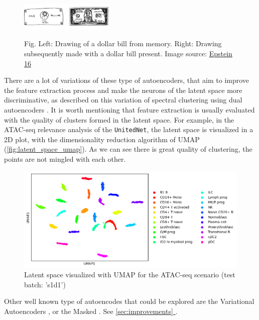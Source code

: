 \documentclass[12pt, a4paper]{article}
\newcommand*{\fullref}[1]{\hyperref[{#1}]{\ref*{#1} \nameref*{#1}}}
\begin{document}
\begin{figure}[h!]
  \centering
  \includegraphics[width=0.4\textwidth]{dollars.png}\
  \caption{Fig. Left: Drawing of a dollar bill from memory. Right: Drawing subsequently made with a dollar bill present. Image source: \href{https://ankeshanand.com/blog/2020/01/26/contrative-self-supervised-learning.html}{Epstein 16}}
  \label{fig:dollar}
\end{figure}

There are a lot of variations of these type of autoencoders, that aim to improve the feature extraction process and make the neurons of the latent space more discriminative, as described on this variation of spectral clustering using dual autoencoders \cite{yangDeepSpectralClustering2019}. It is worth mentioning that feature extraction is usually evaluated with the quality of clusters formed in the latent space. For example, in the ATAC-seq relevance analysis of the \verb|UnitedNet|, the latent space is visualized in a 2D plot, with the dimensionality reduction algorithm of UMAP (\autoref{fig:latent_space_umap}). As we can see there is great quality of clustering, the points are not mingled with each other.

\begin{figure}[h!]
  \centering
  \includegraphics[width=\textwidth]{latent_space_umap.png}
  \caption{Latent space visualized with UMAP for the ATAC-seq scenario (test batch: 's1d1')}
  \label{fig:latent_space_umap}
\end{figure}

Other well known type of autoencodes that could be explored are the Variational Autoencoders \cite{kingmaAutoEncodingVariationalBayes2022}, or the Masked  \cite{heMaskedAutoencodersAre2021}. See \fullref{sec:improvements}.
\end{document}
